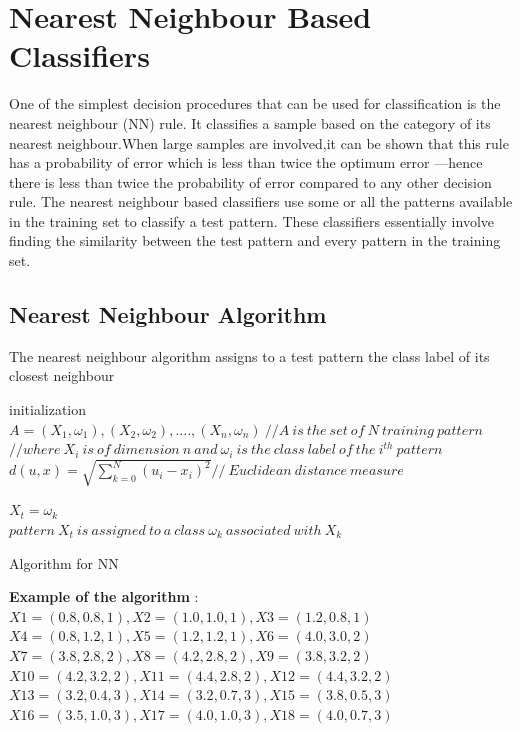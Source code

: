 \section{Nearest Neighbour Based Classifiers}
One of the simplest decision procedures that can be used for classification is the
nearest neighbour (NN) rule. It classifies a sample based on the category of its nearest
neighbour.When large samples are involved,it can be shown that this rule has a
probability of error which is less than twice the optimum error
—hence there is less
than twice the probability of error compared to any other decision rule. The nearest
neighbour based classifiers use some or all the patterns available in the training set
to classify a test pattern. These classifiers essentially involve finding the similarity
between the test pattern and every pattern in the training set.

\subsection{Nearest Neighbour Algorithm}
The nearest neighbour algorithm assigns to a test pattern the class label of its closest
neighbour


\begin{algorithm}[H]
\SetAlgoLined

 initialization\;
 $ A=(X_{1},\omega_{1}),(X_{2},\omega_{2}),....,(X_{n},\omega_{n}) \ // A\ is\ the\ set\ of\ N\ training\ pattern $\\
 
 
$ //where\  X_{i}\ is\ of\ dimension\ n\ and\  \omega_{i}\ is\ the\ class\ label\ of\ the\ i^{th}\ pattern $\\
 
 
 $d(u,x) = \sqrt{\sum_{k=0}^{N} (u_{i}-x_{i})^{2}}  // \ Euclidean\ distance\ measure $\\ 

 
 $ X_{t} = \omega_{k} $ \\
 
 $ pattern\ X_{t}\ is\ assigned\ to\ a\ class\ \omega_{k}\ associated\ with\  X_{k} $
 
 \caption{Algorithm for NN}
\end{algorithm}

\vspace{5mm}
\textbf{Example of the algorithm} :\newline 
$ X1 = (0.8, 0.8, 1), X2 = (1.0, 1.0, 1), X3 = (1.2, 0.8, 1)$\\
$X4 = (0.8, 1.2, 1), X5 = (1.2, 1.2, 1), X6 = (4.0, 3.0, 2)$\\
$X7 = (3.8, 2.8, 2), X8 = (4.2, 2.8, 2), X9 = (3.8, 3.2, 2)$\\
$X10 = (4.2, 3.2, 2), X11 = (4.4, 2.8, 2), X12 = (4.4, 3.2, 2)$\\
$X13 = (3.2, 0.4, 3), X14 = (3.2, 0.7, 3), X15 = (3.8, 0.5, 3)$\\
$X16 = (3.5, 1.0, 3), X17 = (4.0, 1.0, 3), X18 = (4.0, 0.7, 3)$

